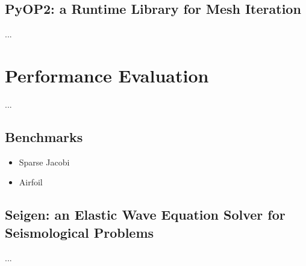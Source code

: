 \subsection{PyOP2: a Runtime Library for Mesh Iteration}
...

\section{Performance Evaluation}
...

\subsection{Benchmarks}
\begin{itemize}
\item Sparse Jacobi
\item Airfoil
\end{itemize}

\subsection{Seigen: an Elastic Wave Equation Solver for Seismological Problems}
\label{sec:tiling:seigen}
...
